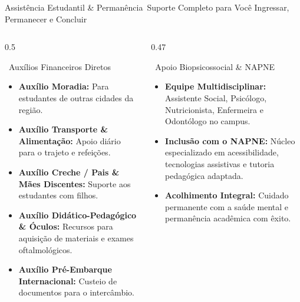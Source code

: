 \begin{frame}{Assistência Estudantil \& Permanência}{\faHands\ Suporte Completo para Você Ingressar, Permanecer e Concluir}
  \begin{columns}[t]
    \begin{column}{0.5\textwidth}
      \begin{bluecard}{\faHandHoldingUsd\ Auxílios Financeiros Diretos}
        \begin{itemize}\setlength{\itemsep}{0.25em}\scriptsize
          \item \textbf{Auxílio Moradia:} Para estudantes de outras cidades da região.
          \item \textbf{Auxílio Transporte \& Alimentação:} Apoio diário para o trajeto e refeições.
          \item \textbf{Auxílio Creche / Pais \& Mães Discentes:} Suporte aos estudantes com filhos.
          \item \textbf{Auxílio Didático-Pedagógico \& Óculos:} Recursos para aquisição de materiais e exames oftalmológicos.
          \item \textbf{Auxílio Pré-Embarque Internacional:} Custeio de documentos para o intercâmbio.
        \end{itemize}
      \end{bluecard}
    \end{column}
    
    \begin{column}{0.47\textwidth}
      \begin{purplecard}{\faHeartbeat\ Apoio Biopsicossocial \& NAPNE}
        \begin{itemize}\setlength{\itemsep}{0.25em}\scriptsize
          \item \textbf{Equipe Multidisciplinar:} Assistente Social, Psicólogo, Nutricionista, Enfermeira e Odontólogo no campus.
          \item \textbf{Inclusão com o NAPNE:} Núcleo especializado em acessibilidade, tecnologias assistivas e tutoria pedagógica adaptada.
          \item \textbf{Acolhimento Integral:} Cuidado permanente com a saúde mental e permanência acadêmica com êxito.
        \end{itemize}
      \end{purplecard}
    \end{column}
  \end{columns}
\end{frame}


